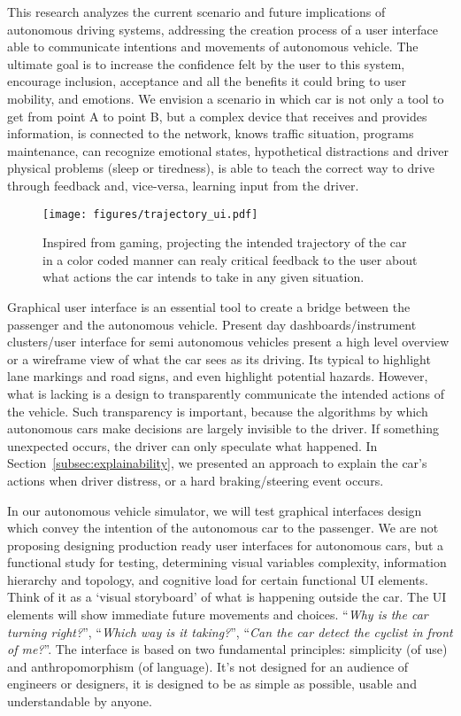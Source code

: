 This research analyzes the current scenario and future implications of autonomous driving systems, addressing the creation process of a user interface able to communicate intentions and movements of autonomous vehicle.
The ultimate goal is to increase the confidence felt by the user to this system, encourage inclusion, acceptance and all the benefits it could bring to user mobility, and emotions.
We envision a scenario in which car is not only a tool to get from point A to point B, but a complex device that receives and provides information, is connected to the network, knows traffic situation, programs maintenance, can recognize emotional states, hypothetical distractions and driver physical problems (sleep or tiredness), is able to teach the correct way to drive through feedback and, vice-versa, learning input from the driver.
\begin{wrapfigure}{r}{0.45\textwidth}
  \begin{center}
    \texttt{[image: figures/trajectory\_ui.pdf]}
  \end{center}
  \caption{Inspired from gaming, projecting the intended trajectory of the car in a color coded manner can realy critical feedback to the user about what actions the car intends to take in any given situation.}
  \label{fig:trajectory}
\end{wrapfigure}
Graphical user interface is an essential tool to create a bridge between the passenger and the autonomous vehicle. 
Present day dashboards/instrument clusters/user interface for semi autonomous vehicles present a high level overview or a wireframe view of what the car sees as its driving. Its typical to highlight lane markings and road signs, and even highlight potential hazards.
However, what is lacking is a design to transparently communicate the intended actions of the vehicle. 
Such transparency is important, because the algorithms by which autonomous cars make decisions are largely invisible to the driver.
If something unexpected occurs, the driver can only speculate what happened. In Section~\ref{subsec:explainability}, we presented an approach to explain the car's actions when driver distress, or a hard braking/steering event occurs. 

In our autonomous vehicle simulator, we will test graphical interfaces design which convey the intention of the autonomous car to the passenger. We are not proposing designing production ready user interfaces for autonomous cars, but a functional study for testing, determining visual variables complexity, information hierarchy and topology, and cognitive load for certain functional UI elements. 
Think of it as a `visual storyboard' of what is happening outside the car. The UI elements will show immediate future movements and choices. ``\textit{Why is the car turning right?}'', ``\textit{Which way is it taking?}'', ``\textit{Can the car detect the cyclist in front of me?}''.
The interface is based on two fundamental principles: simplicity (of use) and anthropomorphism (of language). 
It's not designed for an audience of engineers or designers, it is designed to be as simple as possible, usable and understandable by anyone.

